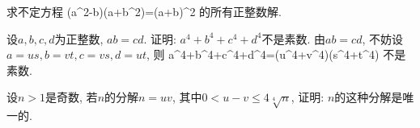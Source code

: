 \newpage
\bq{}{}
求不定方程
\bee
(a^2-b)(a+b^2)=(a+b)^2
\eee
的所有正整数解.
\eq

\newpage
\bq{}{}
设$a,b,c,d$为正整数, $ab=cd$.
证明: $a^4+b^4+c^4+d^4$不是素数.
\eq
\ba
由$ab=cd$, 不妨设$a=us, b=vt, c=vs, d=ut$, 则
\bee
a^4+b^4+c^4+d^4=(u^4+v^4)(s^4+t^4)
\eee
不是素数.
\ea

\newpage
\bq{}{}
设$n>1$是奇数, 若$n$的分解$n=uv$, 其中$0<u-v\le4\sqrt[4]{n}$, 
证明: $n$的这种分解是唯一的.
\eq